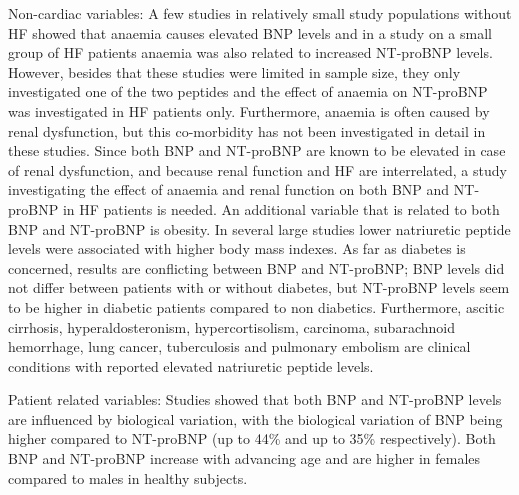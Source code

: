 \documentclass[14pt,a4paper,onecolumn]{extarticle}
\begin{document}
Non-cardiac variables:
A few studies in relatively small study populations without HF showed that anaemia causes elevated BNP levels \citep{Tsuji2004,Willis2005,Wold2005} and in a study on a small group of HF patients anaemia was also related to increased NT-proBNP levels. \citep{Wu2005}
However, besides that these studies were limited in sample size, they only investigated one of the two peptides and the effect of anaemia on NT-proBNP was investigated in HF patients only.
Furthermore, anaemia is often caused by renal dysfunction, but this co-morbidity has not been investigated in detail in these studies. Since both BNP and NT-proBNP are known to be elevated in case of renal dysfunction, \citep{Luchner2005} and because renal function and HF are interrelated, a study investigating the effect of anaemia and renal function on both BNP and NT-proBNP in HF patients is needed.
An additional variable that is related to both BNP and NT-proBNP is obesity. In several large studies lower natriuretic peptide levels were associated with higher body mass indexes. \citep{Das2005,Krauser2005,Mehra2004,Wang2004} As far as diabetes is concerned, results are conflicting between BNP and NT-proBNP; BNP levels did not differ between patients with or without diabetes, \citep{Wu2004} but NT-proBNP levels seem to be higher in diabetic patients compared to non diabetics. \citep{Magnusson2004}
Furthermore, ascitic cirrhosis, hyperaldosteronism, hypercortisolism, carcinoma, subarachnoid hemorrhage, \citep{Pfister2004} lung cancer, tuberculosis and pulmonary embolism \citep{7} are clinical conditions with reported elevated natriuretic peptide levels.

Patient related variables:
Studies showed that both BNP and NT-proBNP levels are influenced by biological variation, with the biological variation of BNP being higher compared to NT-proBNP (up to 44\% and up to 35\% respectively). \citep{Bruins2004,Wu2003b}
Both BNP and NT-proBNP increase with advancing age and are higher in females compared to males in healthy subjects. \citep{Raymond2003} %
\end{document}
